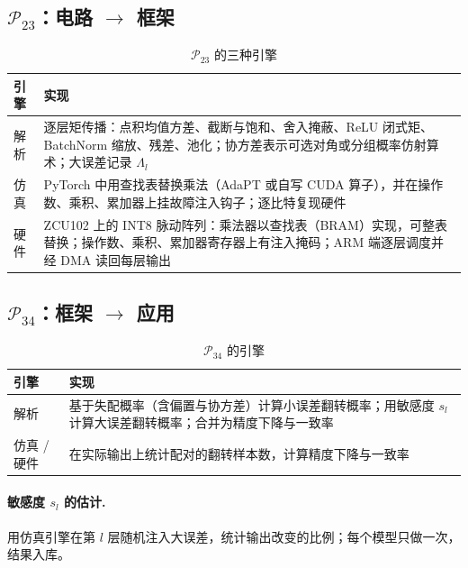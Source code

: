 \documentclass[11pt,a4paper]{ctexart}
\begin{document}
\subsection{$\mathcal P_{23}$：电路 $\to$ 框架}
\begin{table}[h]
\centering
\small
\begin{tabularx}{\textwidth}{@{}lX@{}}
\toprule
引擎 & 实现 \\
\midrule
解析 & 逐层矩传播：点积均值方差、截断与饱和、舍入掩蔽、ReLU 闭式矩、BatchNorm 缩放、残差、池化；协方差表示可选对角或分组概率仿射算术；大误差记录 $\Lambda_l$ \\
仿真 & PyTorch 中用查找表替换乘法（AdaPT 或自写 CUDA 算子），并在操作数、乘积、累加器上挂故障注入钩子；逐比特复现硬件 \\
硬件 & ZCU102 上的 INT8 脉动阵列：乘法器以查找表（BRAM）实现，可整表替换；操作数、乘积、累加器寄存器上有注入掩码；ARM 端逐层调度并经 DMA 读回每层输出 \\
\bottomrule
\end{tabularx}
\caption{$\mathcal P_{23}$ 的三种引擎}
\end{table}

\subsection{$\mathcal P_{34}$：框架 $\to$ 应用}
\begin{table}[h]
\centering
\small
\begin{tabularx}{\textwidth}{@{}lX@{}}
\toprule
引擎 & 实现 \\
\midrule
解析 & 基于失配概率（含偏置与协方差）计算小误差翻转概率；用敏感度 $s_l$ 计算大误差翻转概率；合并为精度下降与一致率 \\
仿真 / 硬件 & 在实际输出上统计配对的翻转样本数，计算精度下降与一致率 \\
\bottomrule
\end{tabularx}
\caption{$\mathcal P_{34}$ 的引擎}
\end{table}

\paragraph{敏感度 $s_l$ 的估计.} 用仿真引擎在第 $l$ 层随机注入大误差，统计输出改变的比例；每个模型只做一次，结果入库。
\end{document}

